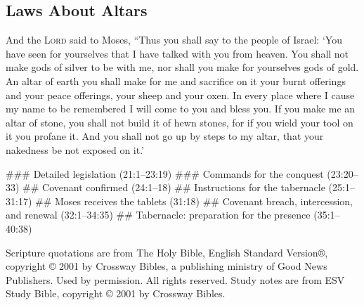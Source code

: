 \documentclass{bible-study-handout}
\begin{document}
\subsection{Laws About Altars}

And the \textsc{Lord} said to Moses, “Thus you shall say to the people of Israel: ‘You have seen for yourselves that I have talked with you from heaven. You shall not make gods of silver to be with me, nor shall you make for yourselves gods of gold. An altar of earth you shall make for me and sacrifice on it your burnt offerings and your peace offerings, your sheep and your oxen. In every place where I cause my name to be remembered I will come to you and bless you. If you make me an altar of stone, you shall not build it of hewn stones, for if you wield your tool on it you profane it. And you shall not go up by steps to my altar, that your nakedness be not exposed on it.’

\begin{bookoutline}
### Detailed legislation (21:1–23:19)
### Commands for the conquest (23:20–33)
## Covenant confirmed (24:1–18)
## Instructions for the tabernacle (25:1–31:17)
## Moses receives the tablets (31:18)
## Covenant breach, intercession, and renewal (32:1–34:35)
## Tabernacle: preparation for the presence (35:1–40:38)
\end{bookoutline}

\newpage
\begin{copyrightstatement}
Scripture quotations are from The Holy Bible, English Standard Version®, copyright © 2001 by Crossway Bibles, a publishing ministry of Good News Publishers. Used by permission. All rights reserved. Study notes are from ESV Study Bible, copyright © 2001 by Crossway Bibles.
\end{copyrightstatement}
\end{document}
